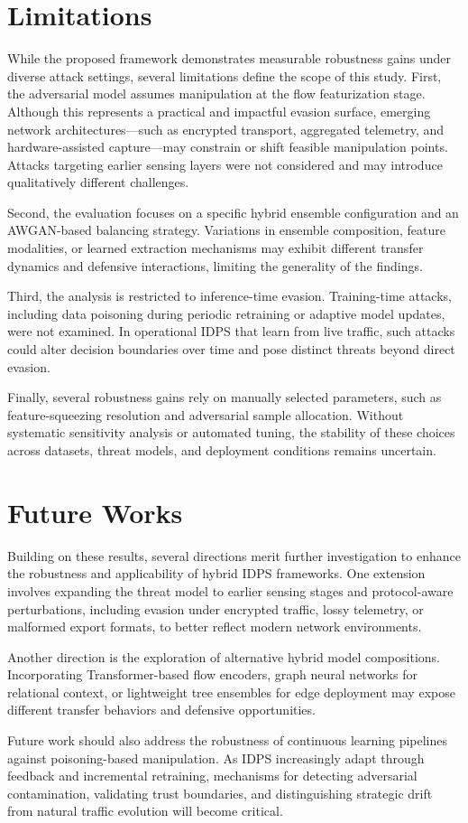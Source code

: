 \documentclass[12pt, a4paper, reqno, oneside]{book}
\newcommand \sect[1]{%
  \section*{#1}%
  \addcontentsline{toc}{section}{#1}}
\begin{document}
\sect{Limitations}

While the proposed framework demonstrates measurable robustness gains under diverse attack settings, several limitations define the scope of this study. First, the adversarial model assumes manipulation at the flow featurization stage. Although this represents a practical and impactful evasion surface, emerging network architectures---such as encrypted transport, aggregated telemetry, and hardware-assisted capture---may constrain or shift feasible manipulation points. Attacks targeting earlier sensing layers were not considered and may introduce qualitatively different challenges.

Second, the evaluation focuses on a specific hybrid ensemble configuration and an AWGAN-based balancing strategy. Variations in ensemble composition, feature modalities, or learned extraction mechanisms may exhibit different transfer dynamics and defensive interactions, limiting the generality of the findings.

Third, the analysis is restricted to inference-time evasion. Training-time attacks, including data poisoning during periodic retraining or adaptive model updates, were not examined. In operational IDPS that learn from live traffic, such attacks could alter decision boundaries over time and pose distinct threats beyond direct evasion.

Finally, several robustness gains rely on manually selected parameters, such as feature-squeezing resolution and adversarial sample allocation. Without systematic sensitivity analysis or automated tuning, the stability of these choices across datasets, threat models, and deployment conditions remains uncertain.

\sect{Future Works}

Building on these results, several directions merit further investigation to enhance the robustness and applicability of hybrid IDPS frameworks. One extension involves expanding the threat model to earlier sensing stages and protocol-aware perturbations, including evasion under encrypted traffic, lossy telemetry, or malformed export formats, to better reflect modern network environments.

Another direction is the exploration of alternative hybrid model compositions. Incorporating Transformer-based flow encoders, graph neural networks for relational context, or lightweight tree ensembles for edge deployment may expose different transfer behaviors and defensive opportunities.

Future work should also address the robustness of continuous learning pipelines against poisoning-based manipulation. As IDPS increasingly adapt through feedback and incremental retraining, mechanisms for detecting adversarial contamination, validating trust boundaries, and distinguishing strategic drift from natural traffic evolution will become critical.
\end{document}
